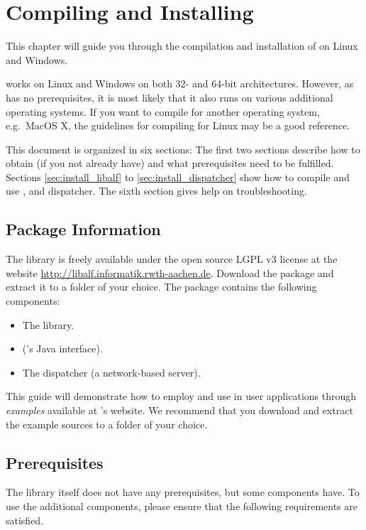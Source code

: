 \chapter{Compiling and Installing \libalf}
This chapter will guide you through the compilation and installation of \libalf on Linux and Windows. 

\libalf works on Linux and Windows on both 32- and 64-bit architectures. However, as \libalf has no prerequisites, it is most likely that it also runs on various additional operating systems. If you want to compile \libalf for another operating system, e.g.\ MacOS X, the guidelines for compiling \libalf for Linux may be a good reference. 

This document is organized in six sections: The first two sections describe how to obtain \libalf (if you not already have) and what prerequisites need to be fulfilled. Sections \ref{sec:install_libalf} to \ref{sec:install_dispatcher} show how to compile and use \libalf, \jalf and dispatcher. The sixth section gives help on troubleshooting.

\section{\libalf Package Information}\label{sec:install_package_info}
The library is freely available under the open source LGPL v3 license at the \libalf website \url{http://libalf.informatik.rwth-aachen.de}. Download the \libalf package and extract it to a folder of your choice. The package contains the following components:
\begin{itemize}
  \item The \libalf \cpp library.
  \item \jalf (\libalf's Java interface).
  \item The dispatcher (a network-based \libalf server).
\end{itemize}

This guide will demonstrate how to employ and use \libalf in user applications through \emph{examples} available at \libalf's website. We recommend that you download and extract the example sources to a folder of your choice.

\section{Prerequisites}
The \libalf library itself does not have any prerequisites, but some components have. To use the additional components, please ensure that the following requirements are satisfied.

